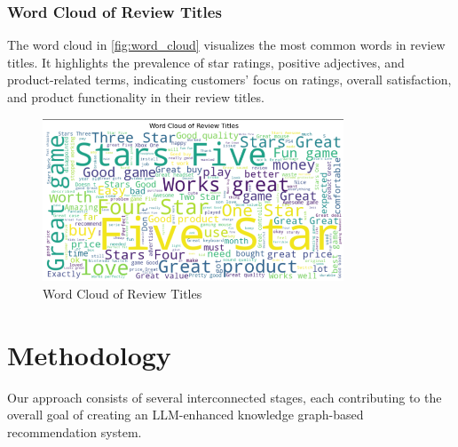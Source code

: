 \documentclass{article}
\begin{document}
\subsubsection{Word Cloud of Review Titles}

The word cloud in \autoref{fig:word_cloud} visualizes the most common words in review titles. It highlights the prevalence of star ratings, positive adjectives, and product-related terms, indicating customers' focus on ratings, overall satisfaction, and product functionality in their review titles.
\begin{figure}[H]
\centering
\includegraphics[width=0.8\textwidth]{img/wordcloud.png}
\caption{Word Cloud of Review Titles}
\label{fig:word_cloud}
\end{figure}

\section{Methodology}
Our approach consists of several interconnected stages, each contributing to the overall goal of creating an LLM-enhanced knowledge graph-based recommendation system.
\end{document}
